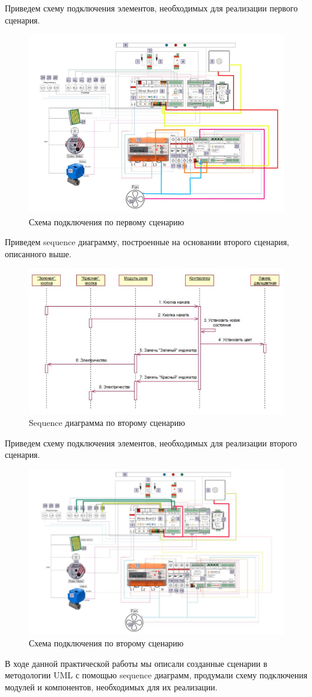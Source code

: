 \documentclass[a4paper,14pt]{extarticle}
\begin{document}
Приведем схему подключения элементов, необходимых для реализации первого сценария.
\begin{figure}[htbp]
	\centering
	\includegraphics[width=0.7\linewidth]{images/deploy-scheme-demo}
	\caption{Схема подключения по первому сценарию}
	\label{fig:deploy-scheme-demo}
\end{figure}
Приведем sequence диаграмму, построенные на основании второго сценария, описанного выше.
\begin{figure}[htbp]
	\centering
	\includegraphics[width=0.7\linewidth]{images/deploy-scheme2}
	\caption{Sequence диаграмма по второму сценарию}
	\label{fig:deploy-scheme2}
\end{figure}
Приведем схему подключения элементов, необходимых для реализации второго сценария.
\begin{figure}[htbp]
	\centering
	\includegraphics[width=0.7\linewidth]{images/deploy-scheme-demo2}
	\caption{Схема подключения по второму сценарию}
	\label{fig:deploy-scheme-demo2}
\end{figure}
В ходе данной практической работы мы описали созданные сценарии в методологии UML с помощью sequence диаграмм, продумали схему подключения модулей и компонентов, необходимых для их реализации.
\end{document}
